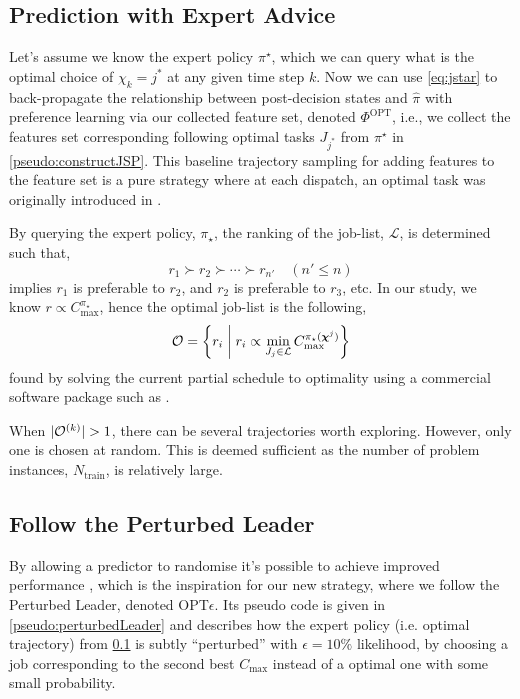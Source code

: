 \documentclass[smallextended]{svjour3}
\begin{document}
\subsection{Prediction with Expert Advice}\label{sec:expertPolicy}
Let's assume we know the expert policy $\pi^\star$, which we can query what 
is the optimal choice of $\chi_k={j^*}$ at any given time step $k$. 
Now we can use \cref{eq:jstar} to back-propagate the relationship between 
post-decision states and $\hat{\pi}$ with preference learning via our collected 
feature set, denoted $\Phi^\text{OPT}$, i.e., we collect the features set 
corresponding following optimal tasks $J_{j^*}$ from $\pi^\star$ in 
\cref{pseudo:constructJSP}.
This baseline trajectory sampling for adding features to the feature set 
is a pure strategy where at each dispatch, an optimal task was originally 
introduced in \cite{InRu11a}.

By querying the expert policy, $\pi_\star$, the ranking of the job-list, 
$\mathcal{L}$, is determined such that,
\begin{equation}
r_1 \succ r_2 \succ \cdots \succ r_{n'} \quad (n' \leq n)
\end{equation}
implies $r_1$  is preferable to $r_2$, and $r_2$ is preferable to $r_3$, etc. 
In  our study, we know $r \propto C_{\max}^{\pi_\star}$, hence the optimal 
job-list is the following, 
\begin{equation}
\mathcal{O}=\left\{r_i\;\middle|\;r_i \propto \min_{J_j \in \mathcal{L}} 
  C_{\max}^{\pi_\star(\bm \chi^j)}\right\}
\end{equation}
found by solving the current partial schedule to optimality using a 
commercial software package such as \cite{gurobi}. 

When $\lvert\mathcal{O}^{(k)}\rvert>1$, there can be several trajectories worth 
exploring. However, only one is chosen at random. This is deemed sufficient as 
the number of problem instances, $N_{\text{train}}$, is relatively large.

\subsection{Follow the Perturbed Leader}\label{sec:perturbedLeader}
By allowing a predictor to randomise it's possible to achieve improved 
performance \cite{CesaBianchi06,Hannan57}, which is the inspiration for our new 
strategy, where we follow the Perturbed Leader, denoted OPT$\epsilon$. 
Its pseudo code is given in \cref{pseudo:perturbedLeader} and describes how the 
expert policy (i.e. optimal trajectory) from \cref{sec:expertPolicy} is subtly
``perturbed'' with $\epsilon=10\%$ likelihood, by choosing a job corresponding 
to the second best $C_{\max}$ instead of a optimal one with some small 
probability. 
\end{document}
